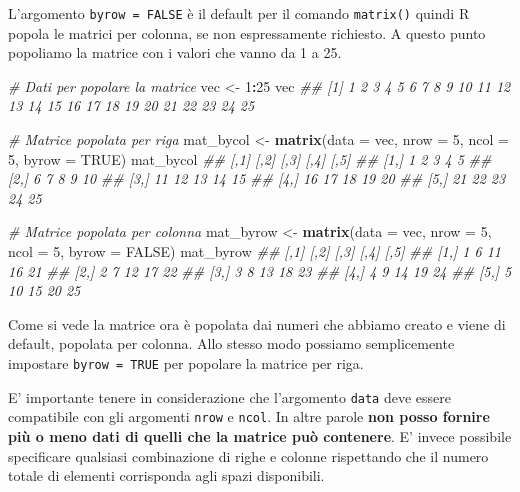 \documentclass[
]{book}
\newenvironment{Shaded}{\begin{snugshade}}{\end{snugshade}}
\newcommand{\CommentTok}[1]{\textcolor[rgb]{0.56,0.35,0.01}{\textit{#1}}}
\newcommand{\DataTypeTok}[1]{\textcolor[rgb]{0.13,0.29,0.53}{#1}}
\newcommand{\DecValTok}[1]{\textcolor[rgb]{0.00,0.00,0.81}{#1}}
\newcommand{\KeywordTok}[1]{\textcolor[rgb]{0.13,0.29,0.53}{\textbf{#1}}}
\newcommand{\NormalTok}[1]{#1}
\newcommand{\OperatorTok}[1]{\textcolor[rgb]{0.81,0.36,0.00}{\textbf{#1}}}
\newcommand{\OtherTok}[1]{\textcolor[rgb]{0.56,0.35,0.01}{#1}}
\newcommand{\StringTok}[1]{\textcolor[rgb]{0.31,0.60,0.02}{#1}}
\begin{document}
L'argomento \texttt{byrow\ =\ FALSE} è il default per il comando \texttt{matrix()} quindi R popola le matrici per colonna, se non espressamente richiesto.
A questo punto popoliamo la matrice con i valori che vanno da 1 a 25.

\begin{Shaded}
\begin{Highlighting}[]
\CommentTok{# Dati per popolare la matrice}
\NormalTok{vec <-}\StringTok{ }\DecValTok{1}\OperatorTok{:}\DecValTok{25}
\NormalTok{vec}
\CommentTok{##  [1]  1  2  3  4  5  6  7  8  9 10 11 12 13 14 15 16 17 18 19 20 21 22 23 24 25}

\CommentTok{# Matrice popolata per riga}
\NormalTok{mat_bycol <-}\StringTok{ }\KeywordTok{matrix}\NormalTok{(}\DataTypeTok{data =}\NormalTok{ vec, }\DataTypeTok{nrow =} \DecValTok{5}\NormalTok{, }\DataTypeTok{ncol =} \DecValTok{5}\NormalTok{, }\DataTypeTok{byrow =} \OtherTok{TRUE}\NormalTok{)}
\NormalTok{mat_bycol}
\CommentTok{##      [,1] [,2] [,3] [,4] [,5]}
\CommentTok{## [1,]    1    2    3    4    5}
\CommentTok{## [2,]    6    7    8    9   10}
\CommentTok{## [3,]   11   12   13   14   15}
\CommentTok{## [4,]   16   17   18   19   20}
\CommentTok{## [5,]   21   22   23   24   25}

\CommentTok{# Matrice popolata per colonna}
\NormalTok{mat_byrow <-}\StringTok{ }\KeywordTok{matrix}\NormalTok{(}\DataTypeTok{data =}\NormalTok{ vec, }\DataTypeTok{nrow =} \DecValTok{5}\NormalTok{, }\DataTypeTok{ncol =} \DecValTok{5}\NormalTok{, }\DataTypeTok{byrow =} \OtherTok{FALSE}\NormalTok{)}
\NormalTok{mat_byrow}
\CommentTok{##      [,1] [,2] [,3] [,4] [,5]}
\CommentTok{## [1,]    1    6   11   16   21}
\CommentTok{## [2,]    2    7   12   17   22}
\CommentTok{## [3,]    3    8   13   18   23}
\CommentTok{## [4,]    4    9   14   19   24}
\CommentTok{## [5,]    5   10   15   20   25}
\end{Highlighting}
\end{Shaded}

Come si vede la matrice ora è popolata dai numeri che abbiamo creato e viene di default, popolata per colonna. Allo stesso modo possiamo semplicemente impostare \texttt{byrow\ =\ TRUE} per popolare la matrice per riga.

E' importante tenere in considerazione che l'argomento \texttt{data} deve essere compatibile con gli argomenti \texttt{nrow} e \texttt{ncol}. In altre parole \textbf{non posso fornire più o meno dati di quelli che la matrice può contenere}. E' invece possibile specificare qualsiasi combinazione di righe e colonne rispettando che il numero totale di elementi corrisponda agli spazi disponibili.
\end{document}
